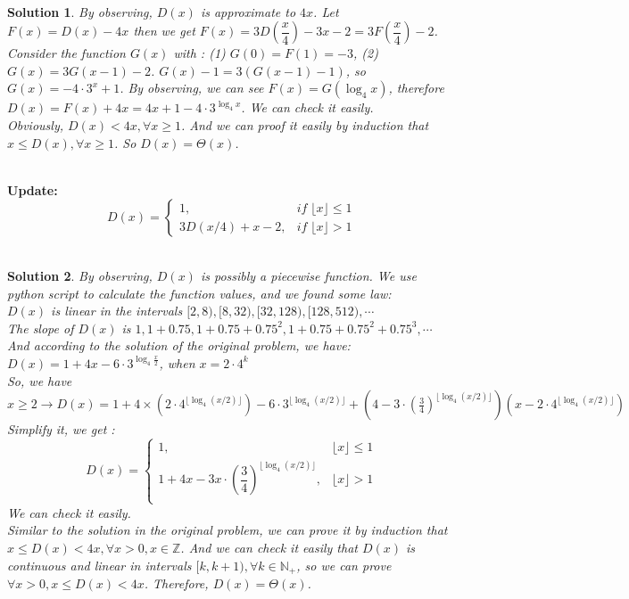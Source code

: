 \documentclass{article}
\newtheorem*{solution}{Solution}
\begin{document}
\begin{enumerate}
~\\
\begin{solution}
  By observing, $D(x)$ is approximate to $4x$. Let $F(x) = D(x) - 4x$ then we get $F(x) = 3D\left(\dfrac{x}{4}\right)-3x-2=3F\left(\dfrac{x}{4}\right)-2$. Consider the function $G(x)$ with : (1) $G(0) = F(1) = -3$, (2) $G(x) = 3G(x-1) - 2$. $G(x) - 1 = 3(G(x-1) - 1)$, so $G(x) = -4\cdot3^x+1$.
  By observing, we can see $F(x) = G(\log_4{x})$, therefore $D(x) = F(x) + 4x = 4x + 1 - 4\cdot 3^{\log_4{x}}$. We can check it easily.  \\
  Obviously, $D(x) < 4x, \forall x\geq 1$. And we can proof it easily by induction that $x \leq D(x), \forall x\geq 1$. So $D(x) = \Theta(x)$. 
\end{solution}
~\\
\textbf{Update:}\\
\begin{equation*}
	D(x) = \begin{cases}
	1, &if\;\lfloor x \rfloor \leq 1\\
	3D(x/4) + x - 2, &if\;\lfloor x \rfloor  > 1
	\end{cases}
\end{equation*}
~\\
\begin{solution}
  By observing, $D(x)$ is possibly a piecewise function. We use python script to calculate the function values, and we found some law:\\
  $D(x)$ is linear in the intervals $[2,8), [8,32), [32, 128), [128,512), \cdots$\\
  The slope of $D(x)$ is $1, 1+0.75, 1+0.75+0.75^2, 1+0.75+0.75^2+0.75^3, \cdots$\\
  And according to the solution of the original problem, we have: $D(x) = 1+4x-6\cdot3^{\log_4\frac{x}{2}}$, when $x=2\cdot4^k$
  \\
  So, we have $x\geq2\rightarrow D(x)=1+4\times(2\cdot4^{\lfloor\log_4{(x/2)}\rfloor})-6\cdot3^{\lfloor\log_4{(x/2)}\rfloor}+(4-3\cdot(\frac{3}{4})^{\lfloor\log_4{(x/2)}\rfloor})(x-2\cdot 4^{\lfloor\log_4{(x/2)}\rfloor})$
  Simplify it, we get :
  \begin{equation*}
    D(x) = \begin{cases}
    1, &\lfloor x \rfloor \leq 1\\
    1+4x-3x\cdot\left(\dfrac{3}{4}\right)^{\lfloor\log_4{(x/2)}\rfloor}, &\lfloor x \rfloor > 1\\
    \end{cases}
  \end{equation*}
  We can check it easily.\\
  Similar to the solution in the original problem, we can prove it by induction that $x \leq D(x) < 4x, \forall x > 0, x \in \mathbb{Z}$.
  And we can check it easily that $D(x)$ is continuous and linear in intervals $[k,k+1), \forall k\in \mathbb{N}_+$, so we can prove $\forall x>0, x \leq D(x) < 4x$. Therefore, $D(x)=\Theta(x)$.
\end{solution}
~\\


\end{enumerate}
\end{document}

